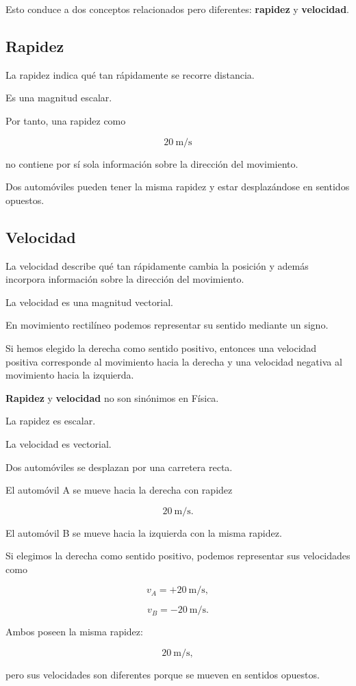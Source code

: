 Esto conduce a dos conceptos relacionados pero diferentes:
\textbf{rapidez} y \textbf{velocidad}.


\subsection{Rapidez}

La rapidez indica qué tan rápidamente se recorre distancia.

Es una magnitud escalar.

Por tanto, una rapidez como

\[ \SI{20}{\meter\per\second} \]

no contiene por sí sola información sobre la dirección del movimiento.

\begin{interpretacion}
Dos automóviles pueden tener la misma rapidez y estar desplazándose en
sentidos opuestos.
\end{interpretacion}


\subsection{Velocidad}

La velocidad describe qué tan rápidamente cambia la posición y además
incorpora información sobre la dirección del movimiento.

La velocidad es una magnitud vectorial.

En movimiento rectilíneo podemos representar su sentido mediante un signo.

Si hemos elegido la derecha como sentido positivo, entonces una velocidad
positiva corresponde al movimiento hacia la derecha y una velocidad
negativa al movimiento hacia la izquierda.

\begin{idea}
\textbf{Rapidez} y \textbf{velocidad} no son sinónimos en Física.

La rapidez es escalar.

La velocidad es vectorial.
\end{idea}

\begin{ejemplo}
Dos automóviles se desplazan por una carretera recta.

El automóvil A se mueve hacia la derecha con rapidez

\[ \SI{20}{\meter\per\second}. \]

El automóvil B se mueve hacia la izquierda con la misma rapidez.

Si elegimos la derecha como sentido positivo, podemos representar sus
velocidades como

\[ v_A=+\SI{20}{\meter\per\second}, \]

\[ v_B=-\SI{20}{\meter\per\second}. \]

Ambos poseen la misma rapidez:

\[ \SI{20}{\meter\per\second}, \]

pero sus velocidades son diferentes porque se mueven en sentidos opuestos.
\end{ejemplo}

